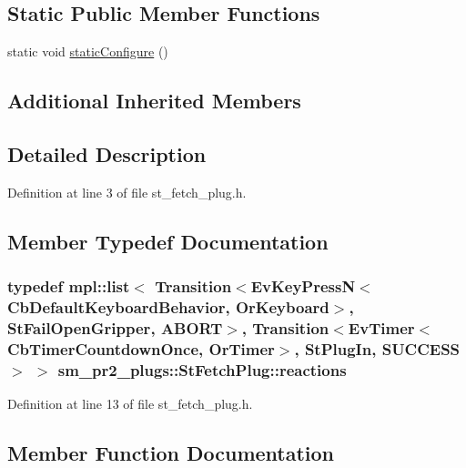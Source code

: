 \subsection*{Static Public Member Functions}
\begin{DoxyCompactItemize}
\item 
static void \hyperlink{structsm__pr2__plugs_1_1StFetchPlug_a61bddcfc32e45d16b7b6b6e637f328cc}{static\+Configure} ()
\end{DoxyCompactItemize}
\subsection*{Additional Inherited Members}


\subsection{Detailed Description}


Definition at line 3 of file st\+\_\+fetch\+\_\+plug.\+h.



\subsection{Member Typedef Documentation}
\subsubsection[{\texorpdfstring{reactions}{reactions}}]{\setlength{\rightskip}{0pt plus 5cm}typedef mpl\+::list$<$ Transition$<$Ev\+Key\+PressN$<$Cb\+Default\+Keyboard\+Behavior, {\bf Or\+Keyboard}$>$, {\bf St\+Fail\+Open\+Gripper}, {\bf A\+B\+O\+RT}$>$, Transition$<$Ev\+Timer$<$Cb\+Timer\+Countdown\+Once, {\bf Or\+Timer}$>$, {\bf St\+Plug\+In}, {\bf S\+U\+C\+C\+E\+SS}$>$ $>$ {\bf sm\+\_\+pr2\+\_\+plugs\+::\+St\+Fetch\+Plug\+::reactions}}\hypertarget{structsm__pr2__plugs_1_1StFetchPlug_a419655234103a8527bd89d0a02e1f0c0}{}\label{structsm__pr2__plugs_1_1StFetchPlug_a419655234103a8527bd89d0a02e1f0c0}


Definition at line 13 of file st\+\_\+fetch\+\_\+plug.\+h.



\subsection{Member Function Documentation}
